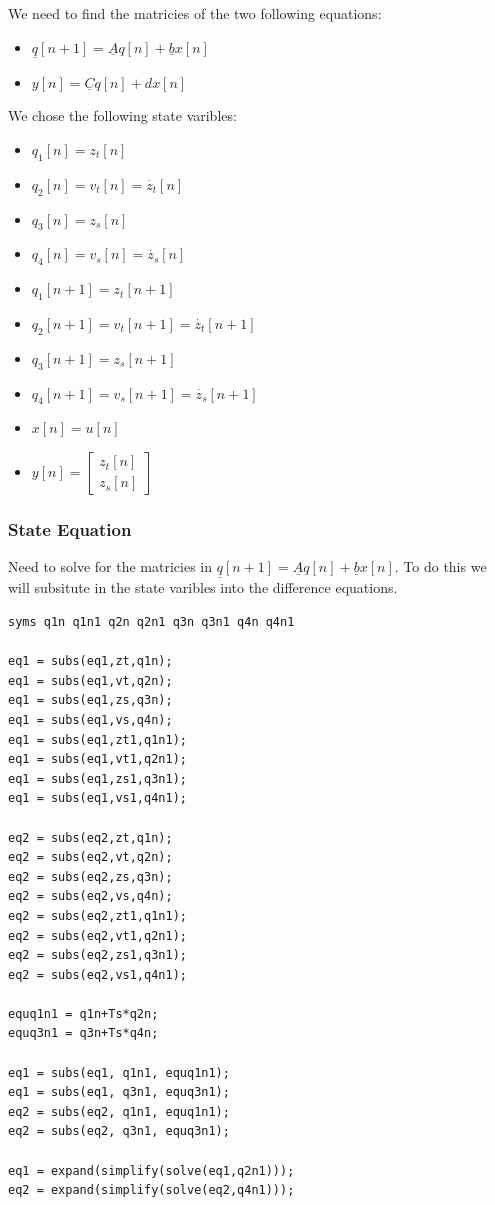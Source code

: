 \documentclass[11pt]{article}
\begin{document}
We need to find the matricies of the two following equations:
\begin{itemize}
\item \(\underline{q}[n+1]=\underline{A}q[n]+\underline{b}x[n]\)
\item \(y[n]=\underline{C}q[n]+dx[n]\)
\end{itemize}
We chose the following state varibles:
\begin{itemize}
\item \(q_1[n] = z_t[n]\)
\item \(q_2[n] = v_t[n] = \dot{z_t}[n]\)
\item \(q_3[n] = z_s[n]\)
\item \(q_4[n] = v_s[n] = \dot{z_s}[n]\)
\item \(q_1[n+1] = z_t[n+1]\)
\item \(q_2[n+1] = v_t[n+1] = \dot{z_t}[n+1]\)
\item \(q_3[n+1] = z_s[n+1]\)
\item \(q_4[n+1] = v_s[n+1] = \dot{z_s}[n+1]\)
\item \(x[n] = u[n]\)
\item \(y[n] = \begin{bmatrix} z_t[n] \\ z_s[n] \end{bmatrix}\)
\end{itemize}
\subsubsection{State Equation}
\label{sec:org99c1e04}
Need to solve for the matricies in \(\underline{q}[n+1]=\underline{A}q[n]+\underline{b}x[n]\). To do this we will subsitute in the state varibles into the difference equations.
\begin{verbatim}
syms q1n q1n1 q2n q2n1 q3n q3n1 q4n q4n1

eq1 = subs(eq1,zt,q1n);
eq1 = subs(eq1,vt,q2n);
eq1 = subs(eq1,zs,q3n);
eq1 = subs(eq1,vs,q4n);
eq1 = subs(eq1,zt1,q1n1);
eq1 = subs(eq1,vt1,q2n1);
eq1 = subs(eq1,zs1,q3n1);
eq1 = subs(eq1,vs1,q4n1);

eq2 = subs(eq2,zt,q1n);
eq2 = subs(eq2,vt,q2n);
eq2 = subs(eq2,zs,q3n);
eq2 = subs(eq2,vs,q4n);
eq2 = subs(eq2,zt1,q1n1);
eq2 = subs(eq2,vt1,q2n1);
eq2 = subs(eq2,zs1,q3n1);
eq2 = subs(eq2,vs1,q4n1);

equq1n1 = q1n+Ts*q2n;
equq3n1 = q3n+Ts*q4n;

eq1 = subs(eq1, q1n1, equq1n1);
eq1 = subs(eq1, q3n1, equq3n1);
eq2 = subs(eq2, q1n1, equq1n1);
eq2 = subs(eq2, q3n1, equq3n1);

eq1 = expand(simplify(solve(eq1,q2n1)));
eq2 = expand(simplify(solve(eq2,q4n1)));
\end{verbatim}
\end{document}
